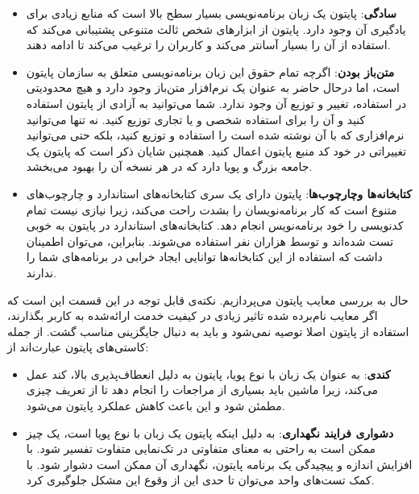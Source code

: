 \begin{itemize}

\item \textbf{سادگی}: پایتون یک زبان برنامه‌نویسی بسیار سطح بالا است که منابع زیادی برای یادگیری آن وجود دارد. پایتون از ابزارهای شخص ثالث متنوعی پشتیبانی می‌کند که استفاده از آن را بسیار آسانتر می‌کند و کاربران را ترغیب می‌کند تا ادامه دهند\cite{srinath2017python, sharma2020python}.

\item \textbf{متن‌باز بودن}: اگرچه تمام حقوق این زبان برنامه‌نویسی متعلق به سازمان پایتون است، اما درحال‌ حاضر به عنوان یک نرم‌افزار متن‌باز وجود دارد و هیچ محدودیتی در استفاده، تغییر و توزیع آن وجود ندارد. شما می‌توانید به آزادی از پایتون استفاده کنید و آن را برای استفاده شخصی و یا تجاری توزیع کنید. نه تنها می‌توانید نرم‌افزاری که با آن نوشته شده است را استفاده و توزیع کنید، بلکه حتی می‌توانید تغییراتی در خود کد منبع پایتون اعمال کنید. همچنین شایان ذکر است که پایتون یک جامعه بزرگ و پویا دارد که در هر نسخه آن را بهبود می‌بخشد\cite{srinath2017python, sharma2020python}.

\item \textbf{کتابخانه‌ها وچارچوب‌ها}: پایتون دارای یک سری کتابخانه‌های استاندارد و چارچوب‌های متنوع است که کار برنامه‌نویسان را بشدت راحت می‌کند، زیرا نیازی نیست تمام کدنویسی را خود برنامه‌نویس انجام دهد. کتابخانه‌های استاندارد در پایتون به خوبی تست شده‌اند و توسط هزاران نفر استفاده می‌شوند. بنابراین، می‌توان اطمینان داشت که استفاده از این کتابخانه‌ها توانایی ایجاد خرابی در برنامه‌های شما را ندارند\cite{srinath2017python, sharma2020python}.

\end{itemize}

حال به بررسی معایب پایتون می‌پردازیم. نکته‌ی قابل توجه در این قسمت این است که اگر معایب نام‌برده شده تاثیر زیادی در کیفیت خدمت ارائه‌شده به کاربر بگذارند، استفاده از پایتون اصلا توصیه نمی‌شود و باید به دنبال جایگزینی مناسب گشت. از جمله کاستی‌های پایتون عبارت‌اند از:

\begin{itemize}

\item \textbf{کندی}: به عنوان یک زبان با نوع پویا، پایتون به دلیل انعطاف‌پذیری بالا، کند عمل می‌کند، زیرا ماشین باید بسیاری از مراجعات را انجام دهد تا از تعریف چیزی مطمئن شود و این باعث کاهش عملکرد پایتون می‌شود\cite{srinath2017python, sharma2020python}.

\item \textbf{دشواری فرایند نگهداری}: به دلیل اینکه پایتون یک زبان با نوع پویا است، یک چیز ممکن است به راحتی به معنای متفاوتی در تک‌نمایی متفاوت تفسیر شود. با افزایش اندازه و پیچیدگی یک برنامه پایتون، نگهداری آن ممکن است دشوار شود. با کمک تست‌های واحد می‌توان تا حدی این از وقوع این مشکل جلوگیری کرد\cite{srinath2017python, sharma2020python}.

\end{itemize}



